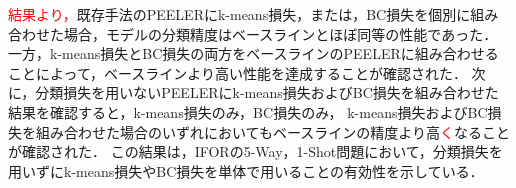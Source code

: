 \documentclass[a4paper,11pt,nomag]{jsreport}
\begin{document}
\textcolor{red}{結果より，}既存手法のPEELERにk-means損失，または，BC損失を個別に組み合わせた場合，モデルの分類精度はベースラインとほぼ同等の性能であった．
一方，k-means損失とBC損失の両方をベースラインのPEELERに組み合わせることによって，ベースラインより高い性能を達成することが確認された．
次に，分類損失を用いないPEELERにk-means損失およびBC損失を組み合わせた結果を確認すると，k-means損失のみ，BC損失のみ，
k-means損失およびBC損失を組み合わせた場合のいずれにおいてもベースラインの精度より高\textcolor{red}{く}なることが確認された．
この結果は，IFORの5-Way，1-Shot問題において，分類損失を用いずにk-means損失やBC損失を単体で用いることの有効性を示している．

\end{document}
